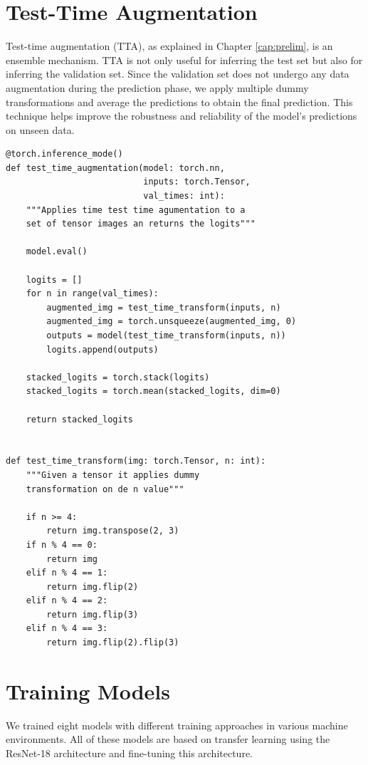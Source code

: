 \section{Test-Time Augmentation}

Test-time augmentation (TTA), as explained in Chapter \ref{cap:prelim}, is an
ensemble mechanism. TTA is not only useful for inferring the test set but also
for inferring the validation set. Since the validation set does not undergo any
data augmentation during the prediction phase, we apply multiple dummy
transformations and average the predictions to obtain the final prediction.
This technique helps improve the robustness and reliability of the model's
predictions on unseen data.

\begin{Verbatim}[fontsize=\scriptsize]
@torch.inference_mode()
def test_time_augmentation(model: torch.nn,
                           inputs: torch.Tensor,
                           val_times: int):
    """Applies time test time agumentation to a
    set of tensor images an returns the logits"""

    model.eval()

    logits = []
    for n in range(val_times):
        augmented_img = test_time_transform(inputs, n)
        augmented_img = torch.unsqueeze(augmented_img, 0)
        outputs = model(test_time_transform(inputs, n))
        logits.append(outputs)

    stacked_logits = torch.stack(logits)
    stacked_logits = torch.mean(stacked_logits, dim=0)

    return stacked_logits


def test_time_transform(img: torch.Tensor, n: int):
    """Given a tensor it applies dummy
    transformation on de n value"""

    if n >= 4:
        return img.transpose(2, 3)
    if n % 4 == 0:
        return img
    elif n % 4 == 1:
        return img.flip(2)
    elif n % 4 == 2:
        return img.flip(3)
    elif n % 4 == 3:
        return img.flip(2).flip(3)
\end{Verbatim}

\section{Training Models}

We trained eight models with different training approaches in various machine
environments. All of these models are based on transfer learning using the
ResNet-18 architecture and fine-tuning this architecture. \\

